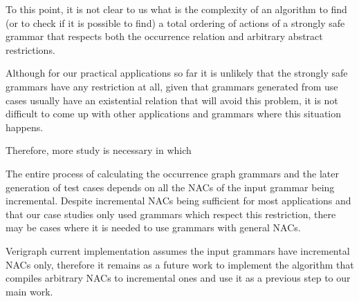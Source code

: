  To this point, it is not clear to us what is the complexity of an algorithm to find (or to check if it is possible to find) a total ordering of actions of a strongly safe grammar that respects both the occurrence relation and arbitrary abstract restrictions.

  Although for our practical applications so far it is unlikely that the strongly safe grammars have any restriction at all, given that grammars generated from use cases usually have an existential relation that will avoid this problem, it is not difficult to come up with other applications and grammars where this situation happens.

  Therefore, more study is necessary in which 

 The entire process of calculating the occurrence graph grammars and the later generation of test cases depends on all the NACs of the input grammar being incremental. Despite incremental NACs being sufficient for most applications and that our case studies only used grammars which respect this restriction, there may be cases where it is needed to use grammars with general NACs.

  Verigraph current implementation assumes the input grammars have incremental NACs only, therefore it remains as a future work to implement the algorithm that compiles arbitrary NACs to incremental ones and use it as a previous step to our main work.
